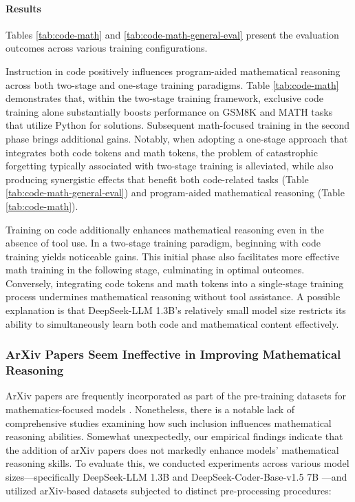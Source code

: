 \begin{itemize}[topsep=0pt]
\paragraph{Results}
Tables \ref{tab:code-math} and \ref{tab:code-math-general-eval} present the evaluation outcomes across various training configurations.

Instruction in code positively influences program-aided mathematical reasoning across both two-stage and one-stage training paradigms. Table \ref{tab:code-math} demonstrates that, within the two-stage training framework, exclusive code training alone substantially boosts performance on GSM8K and MATH tasks that utilize Python for solutions. Subsequent math-focused training in the second phase brings additional gains. Notably, when adopting a one-stage approach that integrates both code tokens and math tokens, the problem of catastrophic forgetting typically associated with two-stage training is alleviated, while also producing synergistic effects that benefit both code-related tasks (Table \ref{tab:code-math-general-eval}) and program-aided mathematical reasoning (Table \ref{tab:code-math}).

Training on code additionally enhances mathematical reasoning even in the absence of tool use. In a two-stage training paradigm, beginning with code training yields noticeable gains. This initial phase also facilitates more effective math training in the following stage, culminating in optimal outcomes. Conversely, integrating code tokens and math tokens into a single-stage training process undermines mathematical reasoning without tool assistance. A possible explanation is that DeepSeek-LLM 1.3B’s relatively small model size restricts its ability to simultaneously learn both code and mathematical content effectively.

\subsubsection{ArXiv Papers Seem Ineffective in Improving Mathematical Reasoning}

ArXiv papers are frequently incorporated as part of the pre-training datasets for mathematics-focused models \citep{minerva,gpt-f,llemma,mathpile}. Nonetheless, there is a notable lack of comprehensive studies examining how such inclusion influences mathematical reasoning abilities. Somewhat unexpectedly, our empirical findings indicate that the addition of arXiv papers does not markedly enhance models' mathematical reasoning skills. To evaluate this, we conducted experiments across various model sizes—specifically DeepSeek-LLM 1.3B and DeepSeek-Coder-Base-v1.5 7B \citep{deepseek-coder}—and utilized arXiv-based datasets subjected to distinct pre-processing procedures:


\end{itemize}

